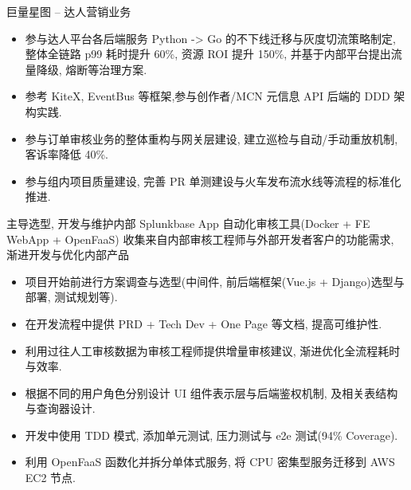 \documentclass{resume}
\begin{document}
\bigbreak
巨量星图 -- 达人营销业务
\begin{itemize}
  \item 参与达人平台各后端服务 Python -> Go 的不下线迁移与灰度切流策略制定, 整体全链路 p99 耗时提升 60\%, 资源 ROI 提升 150\%, 并基于内部平台提出流量降级, 熔断等治理方案.
  \item 参考 KiteX, EventBus 等框架,参与创作者/MCN 元信息 API 后端的 DDD 架构实践.
  \item 参与订单审核业务的整体重构与网关层建设, 建立巡检与自动/手动重放机制, 客诉率降低 40\%.
  \item 参与组内项目质量建设, 完善 PR 单测建设与火车发布流水线等流程的标准化推进.
\end{itemize}

主导选型, 开发与维护内部 Splunkbase App 自动化审核工具(Docker + FE WebApp + OpenFaaS) \newline
收集来自内部审核工程师与外部开发者客户的功能需求, 渐进开发与优化内部产品
\begin{itemize}
  \item 项目开始前进行方案调查与选型(中间件, 前后端框架(Vue.js + Django)选型与部署, 测试规划等).
  \item 在开发流程中提供 PRD + Tech Dev + One Page 等文档, 提高可维护性.
  \item 利用过往人工审核数据为审核工程师提供增量审核建议, 渐进优化全流程耗时与效率.
  \item 根据不同的用户角色分别设计 UI 组件表示层与后端鉴权机制, 及相关表结构与查询器设计.
  \item 开发中使用 TDD 模式, 添加单元测试, 压力测试与 e2e 测试(94\% Coverage).
  \item 利用 OpenFaaS 函数化并拆分单体式服务, 将 CPU 密集型服务迁移到 AWS EC2 节点.
\end{itemize}

\end{document}
